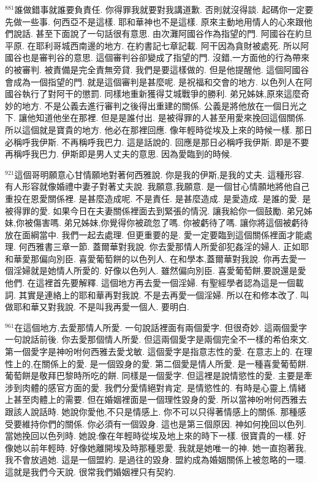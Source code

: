 \documentclass{book}
\begin{document}
$^{881}$誰做錯事就誰要負責任.
你得罪我就要對我講道歉.
否則就沒得談.
起碼你一定要先做一些事.
何西亞不是這樣.
耶和華神也不是這樣.
原來主動地用情人的心來跟他們說話.
甚至下面說了一句話很有意思.
由次灘阿國谷作為指望的門.
阿國谷在約旦平原.
在耶利哥城西南邊的地方.
在約書記七章記載.
阿干因為貪財被處死.
所以阿國谷也是審判谷的意思.
這個審判谷卻變成了指望的門.
沒錯,一方面他的行為帶來的被審判.
被責備是完全責無旁貸.
我們是要這樣做的.
但是他提醒他.
這個阿國谷會成為一個指望的門.
就是這個審判是甚麼呢.
是祝福和交會的地方.
以色列人在阿國谷執行了對阿干的懲罰.
同樣地重新獲得艾城戰爭的勝利.
弟兄姊妹,原來這麼奇妙的地方.
不是公義去進行審判之後得出重建的關係.
公義是將他放在一個日光之下.
讓他知道他坐在那裡.
但是是誰付出.
是被得罪的人甚至用愛來挽回這個關係.
所以這個就是寶貴的地方.
他必在那裡回應.
像年輕時從埃及上來的時候一樣.
那日必稱呼我伊斯.
不再稱呼我巴力.
這是話說的.
回應是那日必稱呼我伊斯.
即是不要再稱呼我巴力.
伊斯即是男人丈夫的意思.
因為愛臨到的時候.

$^{921}$這個哥明願意心甘情願地對著何西雅說.
你是我的伊斯,是我的丈夫.
這種形容.
有人形容就像婚禮中妻子對著丈夫說.
我願意,我願意.
是一個甘心情願地將他自己重投在恩愛關係裡.
是甚麼造成呢.
不是責任.
是甚麼造成.
是愛造成.
是誰的愛.
是被得罪的愛.
如果今日在夫妻關係裡面去到緊張的情況.
讓我給你一個鼓勵.
弟兄姊妹,你被傷害嗎.
弟兄姊妹,你覺得你被疏忽了嗎.
你被虧待了嗎.
讓你將這個被虧待放在面綱當中.
我們一起去處理.
但更重要的是.
愛一定要臨到這個關係裡面才能處理.
何西雅書三章一節.
蓋爾華對我說.
你去愛那情人所愛卻犯姦淫的婦人.
正如耶和華愛那偏向別臣.
喜愛葡萄餅的以色列人.
在和學本,蓋爾華對我說.
你再去愛一個淫婦就是她情人所愛的.
好像以色列人.
雖然偏向別臣.
喜愛葡萄餅,要說還是愛他們.
在這裡首先要解釋.
這個地方再去愛一個淫婦.
有聖經學者認為這是一個載詞.
其實是連絡上的耶和華再對我說.
不是去再愛一個淫婦.
所以在和修本改了.
叫做耶和華又對我說.
不是叫我再愛一個人.
要明白.

$^{961}$在這個地方,去愛那情人所愛.
一句說話裡面有兩個愛字.
但很奇妙.
這兩個愛字一句說話前後.
你去愛那個情人所愛.
但這兩個愛字是兩個完全不一樣的希伯來文.
第一個愛字是神吩咐何西雅去愛戈敏.
這個愛字是指意志性的愛.
在意志上的.
在理性上的,在關係上的愛.
是一個毀身的愛.
第二個愛是情人所愛.
是一種喜愛葡萄餅.
葡萄餅是敬拜巴黎時所吃的餅.
同樣是一個愛字.
但這裡是說情慾性的愛.
主要是牽涉到肉體的感官方面的愛.
我們分愛情絕對肯定.
是情慾性的.
有時是心靈上,情緒上甚至肉體上的需要.
但在婚姻裡面是一個理性毀身的愛.
所以當神吩咐何西雅去跟該人說話時.
她說你愛他,不只是情感上.
你不可以只得著情感上的關係.
那種感受要維持你們的關係.
你必須有一個毀身.
這也是第三個原因.
神如何挽回以色列.
當她挽回以色列時.
她說:像在年輕時從埃及地上來的時下一樣.
很寶貴的一樣.
好像她以前年輕時.
好像她離開埃及時那種恩愛.
我就是她唯一的神.
她一直抱著我,我不會放過她.
這是一個盟約.
是過往的毀身.
盟約成為婚姻關係上被忽略的一環.
這就是我們今天說.
很常我們婚姻裡只有契約.
\end{document}
